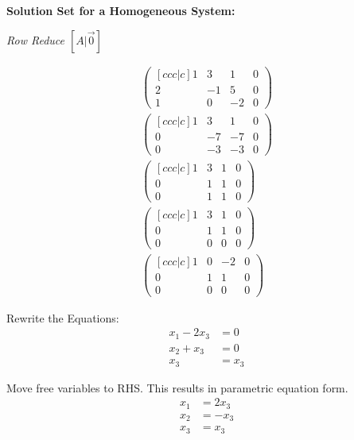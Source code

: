 \noindent
\newline
\textbf{Solution Set for a Homogeneous System:}

\noindent
\textit{Row Reduce \([A|\Vec{0}]\)}

\begin{align}
    \begin{pmatrix}[ccc|c]
        1 & 3 & 1 & 0 \\
        2 & -1 & 5 & 0 \\
        1 & 0 & -2 & 0
    \end{pmatrix} \\
    \begin{pmatrix}[ccc|c]
        1 & 3 & 1 & 0 \\
        0 & -7 & -7 & 0 \\
        0 & -3 & -3 & 0
    \end{pmatrix} \\
    \begin{pmatrix}[ccc|c]
        1 & 3 & 1 & 0 \\
        0 & 1 & 1 & 0 \\
        0 & 1 & 1 & 0
    \end{pmatrix} \\
    \begin{pmatrix}[ccc|c]
        1 & 3 & 1 & 0 \\
        0 & 1 & 1 & 0 \\
        0 & 0 & 0 & 0
    \end{pmatrix} \\
    \begin{pmatrix}[ccc|c]
        1 & 0 & -2 & 0 \\
        0 & 1 & 1 & 0 \\
        0 & 0 & 0 & 0
    \end{pmatrix}
\end{align}

\noindent
\newline
Rewrite the Equations:
\begin{align}
    x_1 - 2x_3 &= 0 \\
    x_2 + x_3 &= 0 \\
    x_3 &= x_3
\end{align}

\noindent
\newline
Move free variables to RHS. This results in parametric equation form.
\begin{align}
    x_1 &= 2x_3 \\
    x_2 &= -x_3 \\
    x_3 &= x_3
\end{align}

